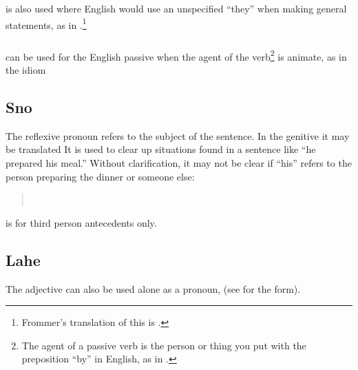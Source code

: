\subsubsection{}  is also used where English would use an
unspecified ``they'' when making general statements, as in
.\footnote{Frommer's
translation of this is .}

\subsubsection{}  can be used for the English passive when the
agent of the verb\footnote{The agent of a passive verb is the person
or thing you put with the preposition ``by'' in English, as in .} is animate, as in the idiom    
\label{syn:prn:fko}

\subsection{Sno}  The reflexive
pronoun  refers to the subject of the sentence.  In the
genitive it may be translated 
It is used to clear up situations found in a sentence like ``he
prepared his meal.''  Without clarification, it may not be clear if
``his'' refers to the person preparing the dinner or someone else:

\begin{quotation}
\noindent{} \\
\noindent{} 
\end{quotation}

\noindent {} is for third person antecedents only.

\subsection{Lahe} The adjective   can also
be used alone as a pronoun,   (see  for the form).

